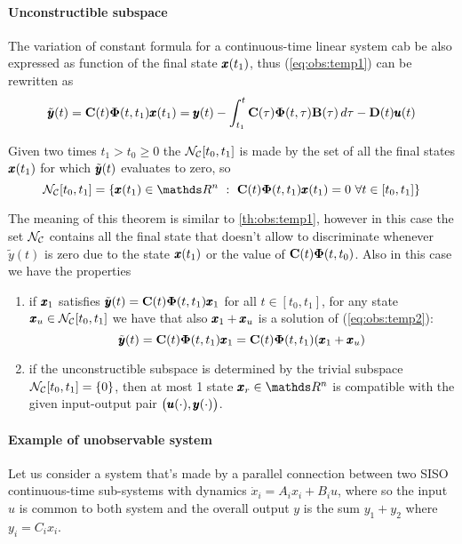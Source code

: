 	\paragraph{Unconstructible subspace} The variation of constant formula for a continuous-time linear system cab be also expressed as function of the final state $\pmb{x}(t_1)$, thus (\ref{eq:obs:temp1}) can be rewritten as
	\begin{equation} \label{eq:obs:temp2}
		\tilde {\pmb{y}}(t) = \mathbf{C}(t)\mathbf{\Phi}(t,t_1)\pmb{x}(t_1) = \pmb{y}(t) - \int_{t_1}^t \mathbf{C}(\tau)\mathbf{\Phi}(t,\tau)\mathbf{B}(\tau)\, d\tau - \mathbf{D}(t)\pmb{u}(t)
	\end{equation}
	\begin{theorem}
		Given two times $t_1>t_0 \geq 0$ the  $\mathcal{N_C}[t_0,t_1]$ is made by the set of all the final states $\pmb{x}(t_1)$ for which $\tilde{\pmb{y}}(t)$ evaluates to zero, so
		\begin{equation}
			\uncostr[t_0,t_1] = \left\{ \x(t_1)\in \mathds R^n \ : \ \C(t)\stm(t,t_1)\x(t_1) = 0 \ \forall t\in [t_0,t_1] \right\}
		\end{equation} 
	\end{theorem}
	The meaning of this theorem is similar to \ref{th:obs:temp1}, however in this case the set $\mathcal{N_C}$ contains all the final state that doesn't allow to discriminate whenever $\tilde y(t)$ is zero due to the state $\pmb{x}(t_1)$ or the value of $\mathbf{C}(t)\mathbf{\Phi}(t,t_0)$. Also in this case we have the properties\\
	\begin{enumerate}[\itshape i)]
		\item if $\pmb{x}_1$ satisfies $\tilde {\pmb{y}}(t) = \mathbf{C}(t) \mathbf{\Phi}(t,t_1)\pmb{x}_1$ for all $t\in[t_0,t_1]$, for any state $\pmb{x}_u\in \mathcal{N_C}[t_0,t_1]$ we have that also $\pmb{x}_1+\pmb{x}_u$ is a solution of (\ref{eq:obs:temp2}):
		\[ \tilde {\pmb{y}}(t) = \mathbf{C}(t)\mathbf{\Phi}(t,t_1)\pmb{x}_1 = \mathbf{C}(t)\mathbf{\Phi}(t,t_1)(\pmb{x}_1 + \pmb{x}_u) \]
		\item if the unconstructible subspace is determined by the trivial subspace $\mathcal{N_C}[t_0,t_1] = \{0\}$, then at most 1 state $\x_r\in \mathds R^n$ is compatible with the given input-output pair $\big(\pmb{u}(\cdot), \pmb{y}(\cdot)\big)$.
	\end{enumerate}
	
	\paragraph{Example of unobservable system} Let us consider a system that's made by a parallel connection between two SISO continuous-time sub-systems with dynamics $\dot x_i = A_i x_i + B_i u$, where so the input $u$ is common to both system and the overall output $y$ is the sum $y_1 + y_2$ where $y_i = C_ix_i$.
	
